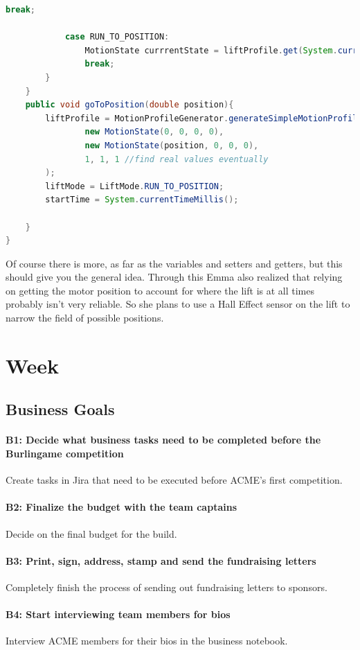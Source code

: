 \documentclass{article}
\begin{document}
\begin{lstlisting}[language=Java]
                break;

            case RUN_TO_POSITION:
                MotionState currrentState = liftProfile.get(System.currentTimeMillis() - startTime);
                break;
        }
    }
    public void goToPosition(double position){
        liftProfile = MotionProfileGenerator.generateSimpleMotionProfile(
                new MotionState(0, 0, 0, 0),
                new MotionState(position, 0, 0, 0),
                1, 1, 1 //find real values eventually
        );
        liftMode = LiftMode.RUN_TO_POSITION;
        startTime = System.currentTimeMillis();

    }
}
\end{lstlisting}
Of course there is more, as far as the variables and setters and getters, but this should give you the general idea. Through this Emma also realized that relying on getting the motor position to account for where the lift is at all times probably isn't very reliable. So she plans to use a Hall Effect sensor on the lift to narrow the field of possible positions.
\clearpage \newpage \section{Week \thesection} 
\subsection{Business Goals}
\paragraph{B1: Decide what business tasks need to be completed before the Burlingame competition}
 Create tasks in Jira that need to be executed before ACME's first competition.
\paragraph{B2: Finalize the budget with the team captains}
 Decide on the final budget for the build.
\paragraph{B3: Print, sign, address, stamp and send the fundraising letters}
 Completely finish the process of sending out fundraising letters to sponsors.
\paragraph{B4: Start interviewing team members for bios}
 Interview ACME members for their bios in the business notebook.
\end{document}
